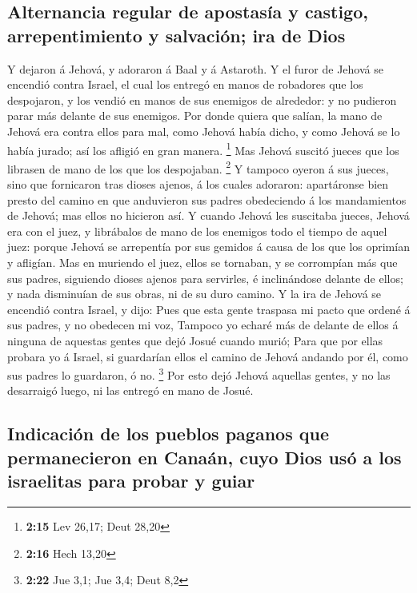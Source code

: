 \hypertarget{alternancia-regular-de-apostasuxeda-y-castigo-arrepentimiento-y-salvaciuxf3n-ira-de-dios}{%
\subsection{Alternancia regular de apostasía y castigo, arrepentimiento
y salvación; ira de
Dios}\label{alternancia-regular-de-apostasuxeda-y-castigo-arrepentimiento-y-salvaciuxf3n-ira-de-dios}}

 Y dejaron á Jehová, y adoraron á Baal y á Astaroth.
 Y el furor de Jehová se encendió contra Israel, el cual
los entregó en manos de robadores que los despojaron, y los vendió en
manos de sus enemigos de alrededor: y no pudieron parar más delante de
sus enemigos.  Por donde quiera que salían, la mano de
Jehová era contra ellos para mal, como Jehová había dicho, y como Jehová
se lo había jurado; así los afligió en gran manera. \footnote{\textbf{2:15}
  Lev 26,17; Deut 28,20}  Mas Jehová suscitó jueces que los
librasen de mano de los que los despojaban. \footnote{\textbf{2:16} Hech
  13,20}  Y tampoco oyeron á sus jueces, sino que
fornicaron tras dioses ajenos, á los cuales adoraron: apartáronse bien
presto del camino en que anduvieron sus padres obedeciendo á los
mandamientos de Jehová; mas ellos no hicieron así.  Y
cuando Jehová les suscitaba jueces, Jehová era con el juez, y librábalos
de mano de los enemigos todo el tiempo de aquel juez: porque Jehová se
arrepentía por sus gemidos á causa de los que los oprimían y afligían.
 Mas en muriendo el juez, ellos se tornaban, y se
corrompían más que sus padres, siguiendo dioses ajenos para servirles, é
inclinándose delante de ellos; y nada disminuían de sus obras, ni de su
duro camino.  Y la ira de Jehová se encendió contra Israel,
y dijo: Pues que esta gente traspasa mi pacto que ordené á sus padres, y
no obedecen mi voz,  Tampoco yo echaré más de delante de
ellos á ninguna de aquestas gentes que dejó Josué cuando murió;
 Para que por ellas probara yo á Israel, si guardarían
ellos el camino de Jehová andando por él, como sus padres lo guardaron,
ó no. \footnote{\textbf{2:22} Jue 3,1; Jue 3,4; Deut 8,2} 
Por esto dejó Jehová aquellas gentes, y no las desarraigó luego, ni las
entregó en mano de Josué.

\hypertarget{indicaciuxf3n-de-los-pueblos-paganos-que-permanecieron-en-canauxe1n-cuyo-dios-usuxf3-a-los-israelitas-para-probar-y-guiar}{%
\subsection{Indicación de los pueblos paganos que permanecieron en
Canaán, cuyo Dios usó a los israelitas para probar y
guiar}\label{indicaciuxf3n-de-los-pueblos-paganos-que-permanecieron-en-canauxe1n-cuyo-dios-usuxf3-a-los-israelitas-para-probar-y-guiar}}

